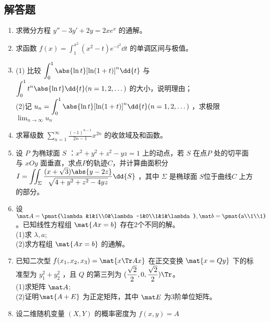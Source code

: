 \subsection{解答题}
\begin{enumerate}
\item 求微分方程 $y''-3y'+2y=2xe^x$ 的通解。
\item 求函数 $\displaystyle f(x)=\int_{1}^{x^2}(x^2-t)e^{-t^2}\dd{t}$ 的单调区间与极值。
\item (1) 比较 $\displaystyle \int_0^1 \abs{\ln t}[\ln (1+t)]^n\dd{t} $ 与  $\displaystyle \int_0^1 t^n \abs{\ln t}\dd{t} (n=1,2,\dots)$ 的大小，说明理由；\\
(2)记 $\displaystyle u_n= \int_0^1 \abs{\ln t}[\ln (1+t)]^n\dd{t} (n=1,2,\dots)$ ，求极限  $\displaystyle \lim_{n\to\infty} u_n$
\item  求幂级数 $\displaystyle \sum_{n=1}^\infty \frac{(-1)^{n-1}}{2n-1}x^{2n}$ 的收敛域及和函数。
\item 设 $P$ 为椭球面 $S$ ：$x^2+y^2+z^2-yz=1$   上的动点，若 $S$ 在点$ P$ 处的切平面与 $xOy$ 面垂直，求点$P$的轨迹$C$，并计算曲面积分 $\displaystyle I=\iint_\Sigma \frac{(x+\sqrt{3})\abs{y-2z}}{\sqrt{4+y^2+z^2-4yz}}\dd{S}$  ，其中 $\Sigma$ 是椭球面  $S$位于曲线$ C$ 上方的部分。
\item 设 $\mat A=\pmat{\lambda &1&1\\0&\lambda-1&0\\1&1&\lambda},\mat b=\pmat{a\\1\\1}$  。已知线性方程组 $\mat {Ax=b}$ 存在2个不同的解。\\
(1)求 $\lambda,a$;\\
(2)求方程组 $\mat {Ax=b}$ 的通解。
\item 已知二次型 $f(x_1,x_2,x_3)=\mat {x \Tr Ax}$  在正交变换 $\mat {x=Qy}$ 下的标准型为 $y_1^2+y_2^2$  ，且 $Q$ 的第三列为 $\displaystyle (\frac{\sqrt{2}}{2},0,\frac{\sqrt{2}}{2})\Tr$。\\
(1)求矩阵  $\mat A$;\\
(2)证明$\mat{ A+E}$  为正定矩阵，其中 $\mat E$ 为3阶单位矩阵。
\item 设二维随机变量 $(X,Y)$ 的概率密度为 $f(x,y)=A$
\end{enumerate}